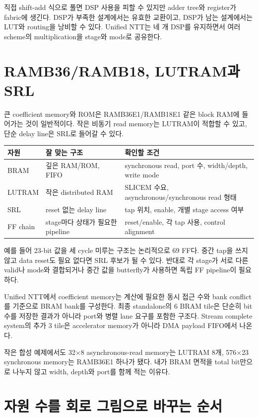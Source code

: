 직접 shift-add 식으로 풀면 DSP 사용을 피할 수 있지만 adder tree와 register가
fabric에 생긴다. DSP가 부족한 설계에서는 유효한 교환이고, DSP가 남는 설계에서는
LUT와 routing을 낭비할 수 있다. Unified NTT는 네 개 DSP를 유지하면서 여러
scheme의 multiplication을 stage와 mode로 공유한다.

\section{RAMB36/RAMB18, LUTRAM과 SRL}

큰 coefficient memory와 ROM은 RAMB36E1/RAMB18E1 같은 block RAM에 들어가는 것이
일반적이다. 작은 비동기 read memory는 LUTRAM이 적합할 수 있고, 단순 delay line은
SRL로 들어갈 수 있다.

\begin{longtable}{L{30mm}L{50mm}L{78mm}}
\toprule
자원 & 잘 맞는 구조 & 확인할 조건 \\
\midrule
\endhead
BRAM & 깊은 RAM/ROM, FIFO & synchronous read, port 수, width/depth, write mode \\
LUTRAM & 작은 distributed RAM & SLICEM 수요, asynchronous/synchronous read 형태 \\
SRL & reset 없는 delay line & tap 위치, enable, 개별 stage access 여부 \\
FF chain & stage마다 상태가 필요한 pipeline & reset/enable, 각 tap 사용, control alignment \\
\bottomrule
\end{longtable}

예를 들어 23-bit 값을 세 cycle 미루는 구조는 논리적으로 69 FF다. 중간 tap을
쓰지 않고 data reset도 필요 없다면 SRL 후보가 될 수 있다. 반대로 각 stage가
서로 다른 valid나 mode와 결합되거나 중간 값을 butterfly가 사용하면 독립 FF
pipeline이 필요하다.

Unified NTT에서 coefficient memory는 계산에 필요한 동시 접근 수와 bank conflict를
기준으로 BRAM bank를 구성한다. 최종 standalone의 6 BRAM tile은 단순히 bit 수를
저장한 결과가 아니라 port와 병렬 lane 요구를 포함한 구조다. Stream complete
system의 추가 3 tile은 accelerator memory가 아니라 DMA payload FIFO에서 나온다.

작은 합성 예제에서도 32$\times$8 asynchronous-read memory는 LUTRAM 8개,
576$\times$23 synchronous memory는 RAMB36E1 하나가 됐다. 내가 BRAM 면적을
total bit만으로 나누지 않고 width, depth와 port를 함께 적는 이유다.

\section{자원 수를 회로 그림으로 바꾸는 순서}

